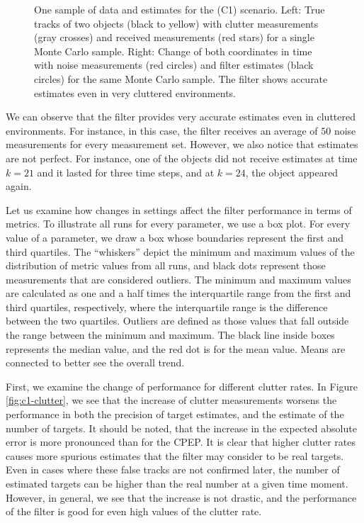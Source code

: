 \begin{figure}
\begin{subfigure}[]{0.48\linewidth}
\begin{subfigure}[b]{\linewidth}
        \end{subfigure}
    \end{subfigure}
  \caption[One sample of data and estimates for the (C1) scenario.]{One sample of data and estimates for the (C1) scenario. Left: True tracks of two objects (black to yellow) with clutter measurements (gray crosses) and received measurements (red stars) for a single Monte Carlo sample. Right: Change of both coordinates in time with noise measurements (red circles) and filter estimates (black circles) for the same Monte Carlo sample. The filter shows accurate estimates even in very cluttered environments.}
  \label{fig:c1-results-overview}
\end{figure}

We can observe that the filter provides very accurate estimates even in cluttered environments. For instance, in this case, the filter receives an average of $50$ noise measurements for every measurement set. However, we also notice that estimates are not perfect. For instance, one of the objects did not receive estimates at time $k=21$ and it lasted for three time steps, and at $k=24$, the object appeared again.

Let us examine how changes in settings affect the filter performance in terms of metrics. To illustrate all runs for every parameter, we use a box plot. For every value of a parameter, we draw a box whose boundaries represent the first and third quartiles. The ``whiskers'' depict the minimum and maximum values of the distribution of metric values from all runs, and black dots represent those measurements that are considered outliers. The minimum and maximum values are calculated as one and a half times the interquartile range from the first and third quartiles, respectively, where the interquartile range is the difference between the two quartiles. Outliers are defined as those values that fall outside the range between the minimum and maximum. The black line inside boxes represents the median value, and the red dot is for the mean value. Means are connected to better see the overall trend. 

First, we examine the change of performance for different clutter rates. In Figure \ref{fig:c1-clutter}, we see that the increase of clutter measurements worsens the performance in both the precision of target estimates, and the estimate of the number of targets. It should be noted, that the increase in the expected absolute error is more pronounced than for the CPEP. It is clear that higher clutter rates causes more spurious estimates that the filter may consider to be real targets. Even in cases where these false tracks are not confirmed later, the number of estimated targets can be higher than the real number at a given time moment. However, in general, we see that the increase is not drastic, and the performance of the filter is good for even high values of the clutter rate.

